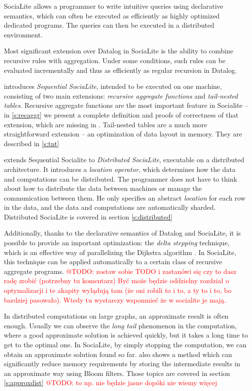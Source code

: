 \documentclass{pracamgr}
\makeatletter
\theoremstyle{plain}
\theoremstyle{definition}
\theoremstyle{remark}
\newcommand{\todo}[1]{\textcolor{red}{@TODO: #1}}
\makeatother
\begin{document}
SociaLite allows a programmer to write intuitive queries using declarative semantics, which can often be executed as efficiently as highly optimized dedicated programs. The queries can then be executed in a distributed environment.

Most significant extension over Datalog in SociaLite is the ability to combine recursive rules with aggregation. Under some conditions, such rules can be evaluated incrementally and thus as efficiently as regular recursion in Datalog.

\cite{socialite} introduces \emph{Sequential SociaLite}, intended to be executed on one machine, consisting of two main extensions: \emph{recursive aggregate functions} and \emph{tail-nested tables}. Recursive aggregate functions are the most important feature in Socialite -- in \ref{s:recaggr} we present a complete definition and proofs of correctness of that extension, which are missing in \cite{socialite}. Tail-nested tables are a much more straightforward extension -- an optimization of data layout in memory. They are described in \ref{s:tnt}

\cite{distsoc} extends Sequential Socialite to \emph{Distributed SociaLite}, executable on a distributed architecture. It introduces a \emph{location operator}, which determines how the data and computations can be distributed. The programmer does not have to think about how to distribute the data between machines or manage the communication between them. He only specifies an abstract \emph{location} for each row in the data, and the data and computations are automatically sharded. Distributed SociaLite is covered in section \ref{s:distributed}

Additionally, thanks to the declarative semantics of Datalog and SociaLite, it is possible to provide an important optimization: the \emph{delta stepping} technique, which is an effective way of parallelizing the Dijkstra algorithm \cite{deltastep}. In SociaLite, this technique can be applied automatically to a certain class of recursive aggregate programs. \todo{zostaw sobie TODO i zastanówi się czy to dasz radę zrobić (potrzebny tu komentarz)
Być może będzie oddzielny rozdział o optymalizacji i te akapity wylądują tam (że oni robili to i to, a ty to i to, bo bardziej pasowało). Wtedy tu wystarczy wspomnieć że w socialite je mają.}

In distributed computations on large graphs, an approximate result is often enough. Usually we can observe the \emph{long tail} phenomenon in the computation, where a good approximate solution is achieved quickly, but it takes a long time to get to the optimal one. In SociaLite, by simply stopping the computation, we can obtain an approximate solution found so far. \cite{distsoc} also shows a method which can significantly reduce memory requirements by storing the intermediate results in an approximate way using Bloom filters. Those topics are covered in section \ref{s:approxdist} \todo{to np. nie będzie jasne dopóki nie wiemy więcej}
\end{document}
